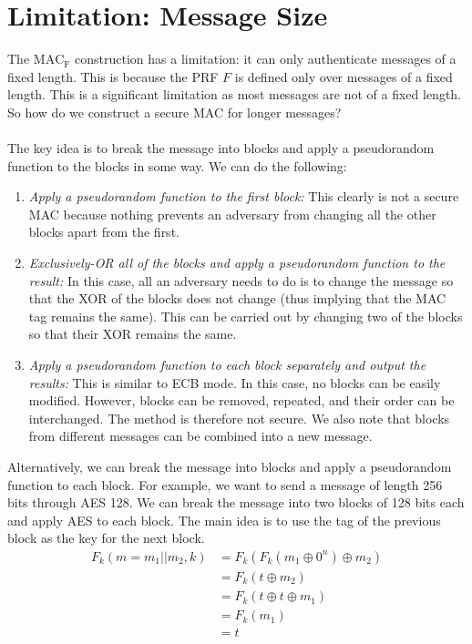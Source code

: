 \documentclass{article}
\begin{document}
\section{Limitation: Message Size}
The $\operatorname{MAC_F}$ construction has a limitation: it can only authenticate messages of a fixed length. This is because the PRF $F$ is defined only over messages of a fixed length. This is a significant limitation as most messages are not of a fixed length. So how do we construct a secure MAC for longer messages? \\ \\
The key idea is to break the message into blocks and apply a pseudorandom function to the blocks in some way. We can do the following:
\begin{enumerate}
    \item \textit{Apply a pseudorandom function to the first block:} This clearly is not a secure MAC because nothing prevents an adversary from changing all the other blocks apart from the first.
    \item \textit{Exclusively-OR all of the blocks and apply a pseudorandom function to the result:} In this case, all an adversary needs to do is to change the message so that the XOR of the blocks does not change (thus implying that the MAC tag remains the same). This can be carried out by changing two of the blocks so that their XOR remains the same.
    \item \textit{Apply a pseudorandom function to each block separately and output the results: }This is similar to ECB mode. In this case, no blocks can be easily modified. However, blocks can be removed, repeated, and their order can be interchanged. The method is therefore not secure. We also note that blocks from different messages can be combined into a new message.
\end{enumerate}
Alternatively, we can break the message into blocks and apply a pseudorandom function to each block. For example, we want to send a message of length 256 bits through AES 128. We can break the message into two blocks of 128 bits each and apply AES to each block. The main idea is to use the tag of the previous block as the key for the next block. 
\begin{align*}
    F_k(m = m_1||m_2, k) &= F_k(F_k(m_1 \oplus 0^n) \oplus m_2) \\
    &= F_k(t \oplus m_2) \\
    &= F_k(t \oplus t \oplus m_1) \\
    &= F_k(m_1) \\
    &= t
\end{align*}
\end{document}
